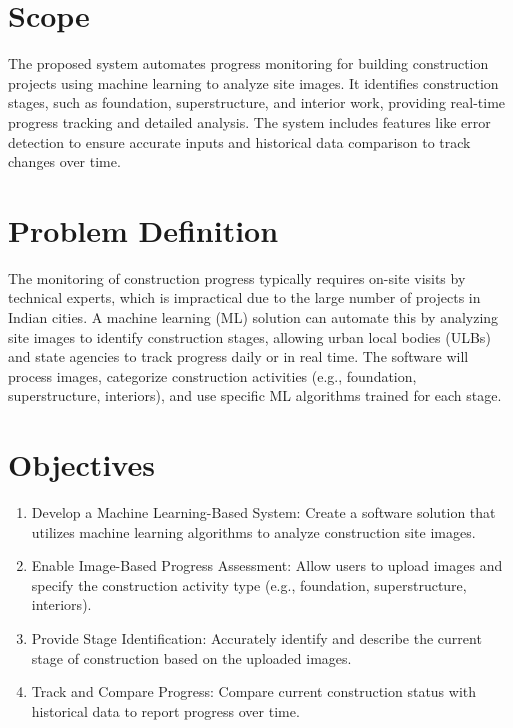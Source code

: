 \section{Scope}
\label{sec:scope-unique}
The proposed system automates progress monitoring for building construction projects using machine learning to analyze site images. It identifies construction stages, such as foundation, superstructure, and interior work, providing real-time progress tracking and detailed analysis. The system includes features like error detection to ensure accurate inputs and historical data comparison to track changes over time.

\section{Problem Definition}
\label{sec:problem-definition-unique}
The monitoring of construction progress typically requires on-site visits by technical experts, which is impractical due to the large number of projects in Indian cities. A machine learning (ML) solution can automate this by analyzing site images to identify construction stages, allowing urban local bodies (ULBs) and state agencies to track progress daily or in real time. The software will process images, categorize construction activities (e.g., foundation, superstructure, interiors), and use specific ML algorithms trained for each stage.

\section{Objectives}
\label{sec:objectives-unique}
\begin{enumerate}
    \item Develop a Machine Learning-Based System: Create a software solution that utilizes machine learning algorithms to analyze construction site images.
    \item Enable Image-Based Progress Assessment: Allow users to upload images and specify the construction activity type (e.g., foundation, superstructure, interiors).
    \item Provide Stage Identification: Accurately identify and describe the current stage of construction based on the uploaded images.
    \item Track and Compare Progress: Compare current construction status with historical data to report progress over time.
\end{enumerate}

